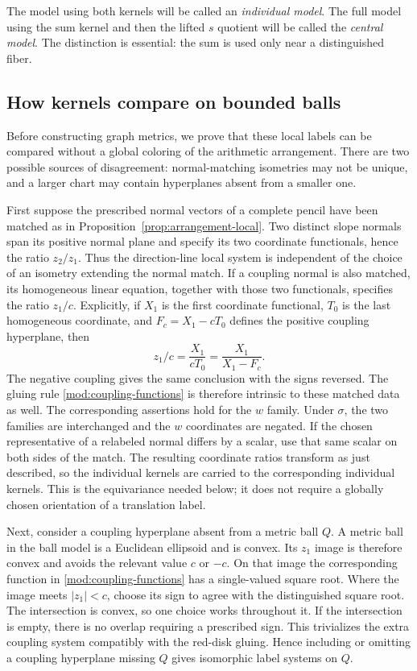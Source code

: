 The model using both kernels will be called an \emph{individual
model}.  The full model using the sum kernel and then the lifted
$s$ quotient will be called the \emph{central model}.  The distinction
is essential: the sum is used only near a distinguished fiber.

\subsection{How kernels compare on bounded balls}

Before constructing graph metrics, we prove that these local labels
can be compared without a global coloring of the arithmetic
arrangement.  There are two possible sources of disagreement:
normal-matching isometries may not be unique, and a larger chart
may contain hyperplanes absent from a smaller one.

First suppose the prescribed normal vectors of a complete pencil
have been matched as in Proposition~\ref{prop:arrangement-local}.
Two distinct slope normals span its positive
normal plane and specify its two coordinate functionals, hence the
ratio $z_2/z_1$.  Thus the direction-line local system is independent
of the choice of an isometry extending the normal match.  If a
coupling normal is also matched, its homogeneous linear equation,
together with those two functionals, specifies the ratio $z_1/c$.
Explicitly, if $X_1$ is the first coordinate functional, $T_0$ is
the last homogeneous coordinate, and $F_c=X_1-cT_0$ defines the
positive coupling hyperplane, then
\[
 z_1/c=\frac{X_1}{cT_0}=\frac{X_1}{X_1-F_c}.
\]
The negative coupling gives the same conclusion with the signs reversed.
The gluing rule \eqref{mod:coupling-functions} is therefore intrinsic
to these matched data as well.  The corresponding assertions hold
for the $w$ family.  Under $\sigma$, the two families are interchanged
and the $w$ coordinates are negated.  If the chosen representative
of a relabeled normal differs by a scalar, use that same scalar on
both sides of the match.  The resulting coordinate ratios transform
as just described, so the individual kernels are carried to the
corresponding individual kernels.  This is the equivariance needed
below; it does not require a globally chosen orientation of a
translation label.

Next, consider a coupling hyperplane absent from a metric ball $Q$.
A metric ball in the ball model is a Euclidean ellipsoid and is
convex.  Its $z_1$ image is therefore convex and avoids the relevant
value $c$ or $-c$.  On that image the corresponding function in
\eqref{mod:coupling-functions} has a single-valued square root.
Where the image meets $|z_1|<c$, choose its sign to agree with the
distinguished square root.  The intersection is convex, so one
choice works throughout it.  If the intersection is empty, there
is no overlap requiring a prescribed sign.  This trivializes the
extra coupling system compatibly with the red-disk gluing.  Hence
including or omitting a coupling hyperplane missing $Q$ gives
isomorphic label systems on $Q$.


